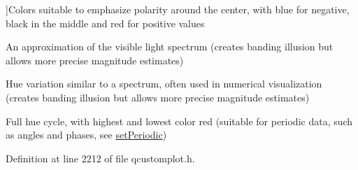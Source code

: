 \begin{Desc}
\begin{description}
{}]Colors suitable to emphasize polarity around the center, with blue for negative, black in the middle and red for positive values \item[{\em 
\hypertarget{class_q_c_p_color_gradient_aed6569828fee337023670272910c9072ad63adc100ef46f6b4a8a6deacec4642f}{}gp\+Spectrum\label{class_q_c_p_color_gradient_aed6569828fee337023670272910c9072ad63adc100ef46f6b4a8a6deacec4642f}
}]An approximation of the visible light spectrum (creates banding illusion but allows more precise magnitude estimates) \item[{\em 
\hypertarget{class_q_c_p_color_gradient_aed6569828fee337023670272910c9072a5f8a9e67b64c17ddfe4f069fe2b9fb02}{}gp\+Jet\label{class_q_c_p_color_gradient_aed6569828fee337023670272910c9072a5f8a9e67b64c17ddfe4f069fe2b9fb02}
}]Hue variation similar to a spectrum, often used in numerical visualization (creates banding illusion but allows more precise magnitude estimates) \item[{\em 
\hypertarget{class_q_c_p_color_gradient_aed6569828fee337023670272910c9072a30efe58407acfb67939032f70213a130}{}gp\+Hues\label{class_q_c_p_color_gradient_aed6569828fee337023670272910c9072a30efe58407acfb67939032f70213a130}
}]Full hue cycle, with highest and lowest color red (suitable for periodic data, such as angles and phases, see \hyperlink{class_q_c_p_color_gradient_a39d6448155fc00a219f239220d14bb39}{set\+Periodic}) \end{description}
\end{Desc}


Definition at line 2212 of file qcustomplot.\+h.


